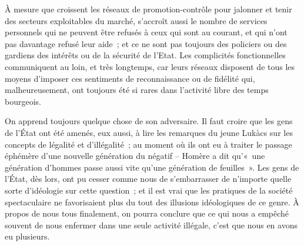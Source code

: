\documentclass[french,twoside]{book} %
\def\mednobreak{\ifdim\lastskip<\medskipamount
  \removelastskip\nopagebreak\medskip\fi}
\newcommand{\labelblock}[1]{\medbreak{\noindent\color{rubric}\bfseries #1}\par\mednobreak}
\begin{document}
À mesure que croissent les réseaux de promotion-contrôle pour jalonner et tenir des secteurs exploitables du marché, s’accroît aussi le nombre de services personnels qui ne peuvent être refusés à ceux qui sont au courant, et qui n’ont pas davantage refusé leur aide ; et ce ne sont pas toujours des policiers ou des gardiens des intérêts ou de la sécurité de l’Etat. Les complicités fonctionnelles communiquent au loin, et très longtemps, car leurs réseaux disposent de tous les moyens d’imposer ces sentiments de reconnaissance ou de fidélité qui, malheureusement, ont toujours été si rares dans l’activité libre des temps bourgeois.\par
On apprend toujours quelque chose de son adversaire. Il faut croire que les gens de l’État ont été amenés, eux aussi, à lire les remarques du jeune Lukàcs sur les concepts de légalité et d’illégalité ; au moment où ils ont eu à traiter le passage éphémère d’une nouvelle génération du négatif – Homère a dit qu’« une génération d’hommes passe aussi vite qu’une génération de feuilles ». Les gens de l’État, dès lors, ont pu cesser comme nous de s’embarrasser de n’importe quelle sorte d’idéologie sur cette question ; et il est vrai que les pratiques de la société spectaculaire ne favorisaient plus du tout des illusions idéologiques de ce genre. À propos de nous tous finalement, on pourra conclure que ce qui nous a empêché souvent de nous enfermer dans une seule activité illégale, c’est que nous en avons eu plusieurs.\par

\labelblock{XXVII}
\end{document}
